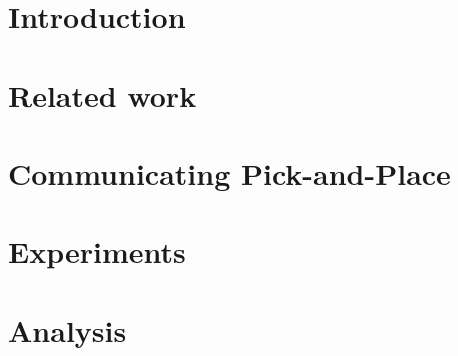 \documentclass[letterpaper]{article}
\begin{document}
\begin{abstract}
\begin{quote}






\end{quote}
\end{abstract}

\section{Introduction}
\label{intro}


\section{Related work}
\label{related-work}


\section{Communicating Pick-and-Place}
\label{problem}


\section{Experiments}
\label{experiments}


\section{Analysis}
\label{analysis}












 

\end{document}
